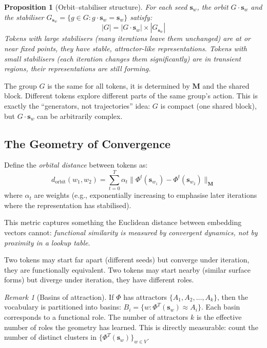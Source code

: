 \documentclass[11pt, a4paper]{article}
\newcommand{\M}{\mathbf{M}}
\newcommand{\s}{\mathbf{s}}
\newtheorem{proposition}{Proposition}
\theoremstyle{remark}
\newtheorem*{remark}{Remark}
\begin{document}
\begin{proposition}[Orbit--stabiliser structure]
For each seed $\s_w$, the orbit $G \cdot \s_w$ and the stabiliser $G_{\s_w} = \{g \in G : g \cdot \s_w = \s_w\}$ satisfy:
\[
    |G| = |G \cdot \s_w| \times |G_{\s_w}|
\]
Tokens with large stabilisers (many iterations leave them unchanged) are at or near fixed points, they have stable, attractor-like representations.
Tokens with small stabilisers (each iteration changes them significantly) are in transient regions, their representations are still forming.
\end{proposition}

The group $G$ is the same for all tokens, it is determined by $\M$ and the shared block.
Different tokens explore different parts of the same group's action.
This is exactly the ``generators, not trajectories'' idea: $G$ is compact (one shared block), but $G \cdot \s_w$ can be arbitrarily complex.

\subsection{The Geometry of Convergence}

Define the \emph{orbital distance} between tokens as:
\[
    d_{\text{orbit}}(w_1, w_2) = \sum_{t=0}^{T} \alpha_t \| \Phi^t(\s_{w_1}) - \Phi^t(\s_{w_2}) \|_\M
\]
where $\alpha_t$ are weights (e.g., exponentially increasing to emphasise later iterations where the representation has stabilised).

This metric captures something the Euclidean distance between embedding vectors cannot: \emph{functional similarity is measured by convergent dynamics, not by proximity in a lookup table}.

Two tokens may start far apart (different seeds) but converge under iteration, they are functionally equivalent.
Two tokens may start nearby (similar surface forms) but diverge under iteration, they have different roles.

\begin{remark}[Basins of attraction]
If $\Phi$ has attractors $\{A_1, A_2, \ldots, A_k\}$, then the vocabulary is partitioned into basins:
$B_i = \{w : \Phi^T(\s_w) \approx A_i\}$.
Each basin corresponds to a functional role.
The number of attractors $k$ is the effective number of roles the geometry has learned.
This is directly measurable: count the number of distinct clusters in $\{\Phi^T(\s_w)\}_{w \in V}$.
\end{remark}
\end{document}
